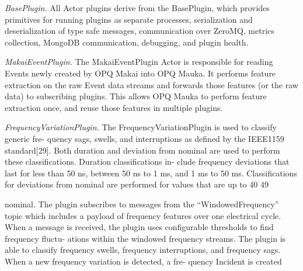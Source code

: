 {\em BasePlugin.} All Actor plugins derive from the BasePlugin, which provides primitives for running plugins as separate processes, serialization and deserialization of type safe messages, communication over ZeroMQ, metrics collection, MongoDB communication, debugging, and plugin health.

{\em MakaiEventPlugin.} The MakaiEventPlugin Actor is responsible for reading Events newly created by OPQ Makai into OPQ Mauka. It performs feature extraction on the raw Event data streams and forwards those features (or the raw data) to subscribing plugins. This allows OPQ Mauka to perform feature extraction once, and reuse those features in multiple plugins.

{\em FrequencyVariationPlugin.} The FrequencyVariationPlugin is used to classify generic fre- quency sags, swells, and interruptions as defined by the IEEE1159 standard[29]. Both duration and deviation from nominal are used to perform these classifications. Duration classifications in- clude frequency deviations that last for less than 50 ns, between 50 ns to 1 ms, and 1 ms to 50 ms. Classifications for deviations from nominal are performed for values that are up to 40%
     49

     nominal. The plugin subscribes to messages from the “WindowedFrequency” topic which includes a payload of frequency features over one electrical cycle.
     When a message is received, the plugin uses configurable thresholds to find frequency fluctu- ations within the windowed frequency streams. The plugin is able to classify frequency swells, frequency interruptions, and frequency sags. When a new frequency variation is detected, a fre- quency Incident is created



